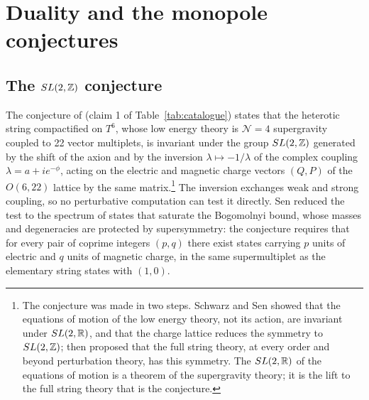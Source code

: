 \section{Duality and the monopole conjectures}\label{sec:sduality}

\subsection{The $SL(2,\mathbb{Z})$ conjecture}\label{ssec:sl2z}

The conjecture of \cite{Sen94duality} (claim 1 of Table~\ref{tab:catalogue}) states that the heterotic string compactified on $T^6$, whose low energy theory is $\mathcal N=4$ supergravity coupled to 22 vector multiplets, is invariant under the group $SL(2,\mathbb{Z})$ generated by the shift of the axion and by the inversion $\lambda\mapsto -1/\lambda$ of the complex coupling $\lambda = a + i e^{-\phi}$, acting on the electric and magnetic charge vectors $(Q,P)$ of the $O(6,22)$ lattice by the same matrix.\footnote{The conjecture was made in two steps. Schwarz and Sen \cite{SchwarzSen93} showed that the equations of motion of the low energy theory, not its action, are invariant under $SL(2,\mathbb{R})$, and that the charge lattice reduces the symmetry to $SL(2,\mathbb{Z})$; \cite{Sen94duality} then proposed that the full string theory, at every order and beyond perturbation theory, has this symmetry. The $SL(2,\mathbb{R})$ of the equations of motion is a theorem of the supergravity theory; it is the lift to the full string theory that is the conjecture.} The inversion exchanges weak and strong coupling, so no perturbative computation can test it directly. Sen reduced the test to the spectrum of states that saturate the Bogomolnyi bound, whose masses and degeneracies are protected by supersymmetry: the conjecture requires that for every pair of coprime integers $(p,q)$ there exist states carrying $p$ units of electric and $q$ units of magnetic charge, in the same supermultiplet as the elementary string states with $(1,0)$.

